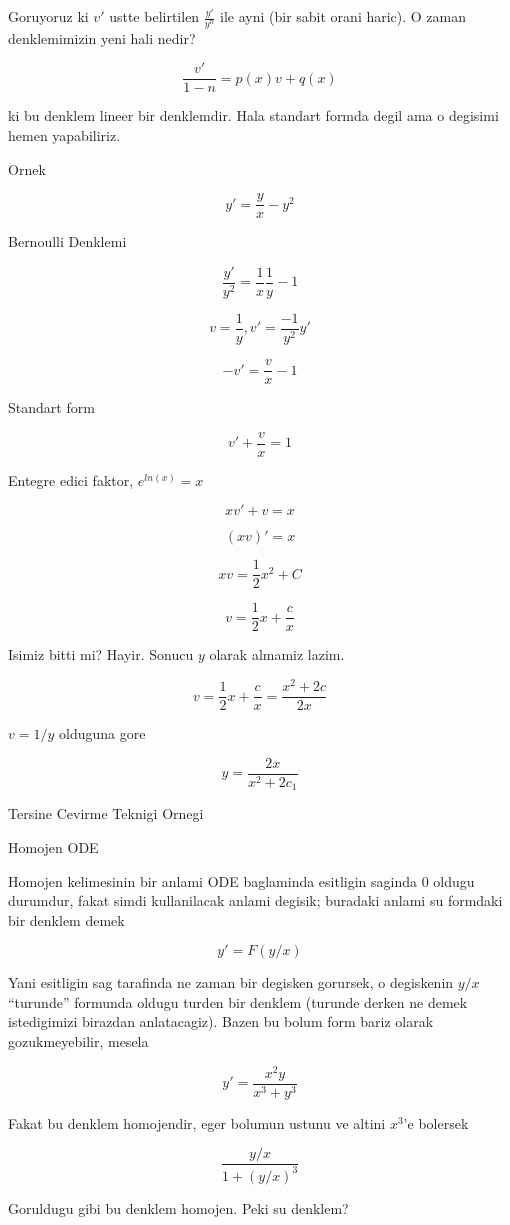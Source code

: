 \documentclass[12pt,fleqn]{article}
\begin{document}
Goruyoruz ki $v'$ ustte belirtilen $\frac{y'}{y^n}$ ile ayni (bir sabit
orani haric). O zaman denklemimizin yeni hali nedir?

\[ \frac{v'}{1-n} = p(x)v + q(x) \]

ki bu denklem lineer bir denklemdir. Hala standart formda degil ama o
degisimi hemen yapabiliriz. 

Ornek

\[ y' = \frac{y}{x} - y^2 \]

Bernoulli Denklemi 

\[ \frac{y'}{y^2} = \frac{1}{x}\frac{1}{y} - 1 \]

\[ v = \frac{1}{y}, v' = \frac{-1}{y^2}y' \]

\[ -v' = \frac{v}{x} - 1 \]

Standart form

\[ v' + \frac{v}{x} = 1 \]

Entegre edici faktor, $e^{ln(x)} = x$

\[ xv' + v = x \]

\[ (xv)' = x \]

\[ xv = \frac{1}{2}x^2 + C \]

\[ v = \frac{1}{2}x + \frac{c}{x} \]

Isimiz bitti mi? Hayir. Sonucu $y$ olarak almamiz lazim. 

\[ v = \frac{1}{2}x + \frac{c}{x} = \frac{x^2+2c}{2x}\]

$v = 1/y$ olduguna gore

\[ y = \frac{2x}{x^2+2c_1}\]

Tersine Cevirme Teknigi Ornegi

Homojen ODE

Homojen kelimesinin bir anlami ODE baglaminda esitligin saginda 0
oldugu durumdur, fakat simdi kullanilacak anlami degisik; buradaki
anlami su formdaki bir denklem demek

\[ y' = F(y/x) \]

Yani esitligin sag tarafinda ne zaman bir degisken gorursek, o
degiskenin $y/x$ ``turunde'' formunda oldugu turden bir denklem
(turunde derken ne demek istedigimizi birazdan anlatacagiz). Bazen bu
bolum form bariz olarak gozukmeyebilir, mesela

\[ y' = \frac{x^2y}{x^3 + y^3} \]

Fakat bu denklem homojendir, eger bolumun ustunu ve altini $x^3$'e
bolersek

\[ \frac{y/x}{1+(y/x)^3} \]

Goruldugu gibi bu denklem homojen. Peki su denklem?
\end{document}
